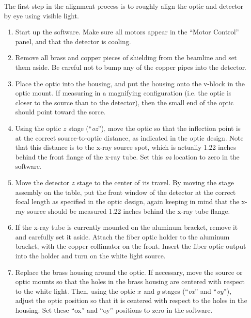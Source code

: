 The first step in the alignment process is to roughly align the optic and detector by eye using visible light.

\begin{enumerate}

\item Start up the software. Make sure all motors appear in the ``Motor Control'' panel, and that the detector is cooling. 

\item Remove all brass and copper pieces of shielding from the beamline and set them aside. Be careful not to bump any of the copper pipes into the detector.

\item Place the optic into the housing, and put the housing onto the v-block in the optic mount. If measuring in a magnifying configuration (i.e. the optic is closer to the source than to the detector), then the small end of the optic should point toward the sorce.

\item Using the optic $z$ stage (``\textit{oz}''), move the optic so that the inflection point is at the correct source-to-optic distance, as indicated in the optic design. Note that this distance is to the x-ray source spot, which is actually 1.22 inches behind the front flange of the x-ray tube. Set this \textit{oz} location to zero in the software.

\item Move the detector $z$ stage to the center of its travel. By moving the stage assembly on the table, put the front window of the detector at the correct focal length as specified in the optic design, again keeping in mind that the x-ray source should be measured 1.22 inches behind the x-ray tube flange.

\item If the x-ray tube is currently mounted on the aluminum bracket, remove it and carefully set it aside. Attach the fiber optic holder to the aluminum bracket, with the copper collimator on the front. Insert the fiber optic output into the holder and turn on the white light source.

\item Replace the brass housing around the optic. If necessary, move the source or optic mounts so that the holes in the brass housing are centered with respect to the white light. Then, using the optic $x$ and $y$ stages (``\textit{ox}'' and ``\textit{oy}''), adjust the optic position so that it is centered with respect to the holes in the housing. Set these ``ox'' and ``oy'' positions to zero in the software.


\end{enumerate}
